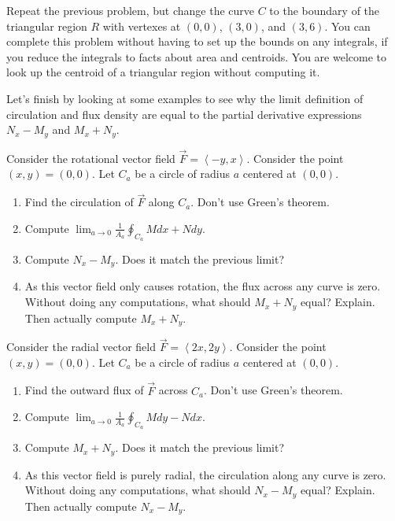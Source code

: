 \begin{problem}
Repeat the previous problem, but change the curve $C$ to the boundary of the triangular region $R$ with vertexes at $(0,0)$, $(3,0)$, and $(3,6)$.  You can complete this problem without having to set up the bounds on any integrals, if you reduce the integrals to facts about area and centroids. You are welcome to look up the centroid of a triangular region without computing it.
\end{problem}


Let's finish by looking at some examples to see why the limit definition of circulation and flux density are equal to the partial derivative expressions $N_x-M_y$ and $M_x+N_y$. 

\begin{problem}
Consider the rotational vector field $\vec F = \left<-y,x\right>$. Consider the point $(x,y)=(0,0)$.  Let $C_a$ be a circle of radius $a$ centered at $(0,0)$.  
\begin{enumerate}
\item Find the circulation of $\vec F$ along $C_a$. Don't use Green's theorem.  
\item Compute $\lim_{a\to 0} \frac{1}{A_a}\oint_{C_a} Mdx+Ndy$.
\item Compute $N_x-M_y$. Does it match the previous limit?
\item As this vector field only causes rotation, the flux across any curve is zero.  Without doing any computations, what should $M_x+N_y$ equal? Explain.  Then actually compute $M_x+N_y$.
\end{enumerate}
\end{problem}


\begin{problem}
Consider the radial vector field $\vec F = \left<2x,2y\right>$. Consider the point $(x,y)=(0,0)$.  Let $C_a$ be a circle of radius $a$ centered at $(0,0)$.  
\begin{enumerate}
\item Find the outward flux of $\vec F$ across $C_a$. Don't use Green's theorem.
\item Compute $\lim_{a\to 0} \frac{1}{A_a}\oint_{C_a} Mdy-Ndx$.
\item Compute $M_x+N_y$. Does it match the previous limit?
\item {}%
As this vector field is purely radial, the circulation along any curve is zero.  Without doing any computations, what should $N_x-M_y$ equal? Explain.  Then actually compute $N_x-M_y$.
\end{enumerate}
\end{problem}

